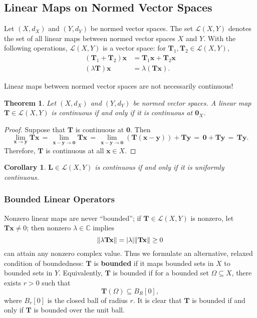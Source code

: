 \documentclass[11pt]{article}
\newtheorem{theorem}{Theorem}
\newtheorem{corollary}{Corollary}
\renewcommand{\vec}[1]{\mathbf{#1}}
\newcommand{\mat}[1]{\mathbf{#1}}
\begin{document}
\newpage


\subsection{Linear Maps on Normed Vector Spaces}

Let $(X, d_{X})$ and $(Y, d_{Y})$ be normed vector spaces. The set $\mathcal{L}(X, Y)$ denotes the set of all linear maps between normed vector spaces $X$ and $Y$. With the following operations, $\mathcal{L}(X, Y)$ is a vector space: for $\mat{T}_{1}, \mat{T}_{2} \in \mathcal{L}(X, Y)$,
\begin{align*}
  (\mat{T}_{1} + \mat{T}_{2})\vec{x} &= \mat{T}_{1} \vec{x} + \mat{T}_{2} \vec{x} \\
           (\lambda \mat{T}) \vec{x} &= \lambda (\mat{T} \vec{x}).
\end{align*}

Linear maps between normed vector spaces are not necessarily continuous!

\begin{theorem}
  Let $(X, d_{X})$ and $(Y, d_{Y})$ be normed vector spaces. A linear map $\mat{T} \in \mathcal{L}(X, Y)$ is continuous if and only if it is continuous at $\vec{0}_{X}$.
\end{theorem}
\begin{adjustwidth}{0.5cm}{}
  \begin{proof}
    Suppose that $\mat{T}$ is continuous at $\vec{0}$. Then
    \[
      \lim\limits_{\vec{x} \to \vec{y}} \mat{T} \vec{x} \, = \,  \lim\limits_{\vec{x} - \vec{y} \to \vec{0}} \mat{T} \vec{x} \, = \, \lim\limits_{\vec{x} - \vec{y} \to \vec{0}} (\mat{T}(\vec{x} - \vec{y})) + \mat{T} \vec{y} \, = \, \vec{0} + \mat{T}\vec{y} \, = \, \mat{T} \vec{y}.
    \]
    Therefore, $\mat{T}$ is continuous at all $\vec{x} \in X$.
  \end{proof}
\end{adjustwidth}
\begin{corollary}
  $\mat{L} \in \mathcal{L}(X, Y)$ is continuous if and only if it is uniformly continuous.
\end{corollary}

\subsubsection{Bounded Linear Operators}

Nonzero linear maps are never ``bounded''; if $\mat{T} \in \mathcal{L}(X, Y)$ is nonzero, let $\mat{T} \vec{x} \ne 0$; then nonzero $\lambda \in \mathbb{C}$ implies
\[
  \norm{\lambda \mat{T}\vec{x}} = \abs{\lambda} \norm{\mat{T} \vec{x}} \ge 0
\]
can attain any nonzero complex value. Thus we formulate an alternative, relaxed condition of boundedness: $\mat{T}$ is \textbf{bounded} if it maps bounded sets in $X$ to bounded sets in $Y$. Equivalently, $\mat{T}$ is bounded if for a bounded set $\Omega \subseteq X$, there exists $r > 0$ such that
\[
  \mat{T}(\Omega) \subseteq B_{R}[0],
\]
where $B_{r}[0]$ is the closed ball of radius $r$. It is clear that $\mat{T}$ is bounded if and only if $\mat{T}$ is bounded over the unit ball.
\end{document}
